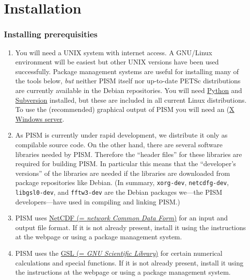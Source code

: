 \documentclass[11pt,final]{amsart}
\begin{document}
\newpage
\section{Installation}\label{sect:install}

\subsubsection*{Installing prerequisities}
\renewcommand{\labelenumi}{\textbf{\arabic{enumi}.}~}
\begin{enumerate}
\item You will need a UNIX system with internet access.  A GNU/Linux environment will be easiest but other UNIX versions have been used successfully.  Package management systems are useful for installing many of the tools below, \emph{but} neither PISM itself nor up-to-date PETSc distributions are currently available in the Debian repositories.  You will need \href{http://www.python.org/}{Python} and \href{http://subversion.tigris.org/}{Subversion} installed, but these are included in all current Linux distributions.  To use the (recommended) graphical output of PISM you will need an  (\href{http://www.x.org/}{X Windows server}.
\item As PISM is currently under rapid development, we distribute it only as compilable source code.  On the other hand, there are several software libraries needed by PISM.  Therefore the ``header files'' for these libraries are required for building PISM.  In particular this means that the ``developer's versions'' of the libraries are needed if the libraries are downloaded from package repositories like Debian.  (In summary, \verb|xorg-dev|, \verb|netcdfg-dev|, \verb|libgsl0-dev|, and \verb|fftw3-dev| are the Debian packages we---the PISM developers---have used in compiling and linking PISM.)

\item PISM uses \href{http://www.unidata.ucar.edu/software/netcdf/}{NetCDF (= \emph{network Common Data Form})} for an input and output file format.   If it is not already present, install it using the instructions at the webpage or using a package management system.

\item PISM uses the \href{http://www.gnu.org/software/gsl/}{GSL (= \emph{GNU Scientific Library})} for certain numerical calculations and special functions.  If it is not already present, install it using the instructions at the webpage or using a package management system.


\end{enumerate}
\end{document}
